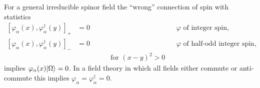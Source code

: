 \begin{theorem}
\label{thm:ch4-10-general-spin-statistics}

For a general irreducible spinor field the “wrong” connection of spin with
statistics
\begin{equation}
\begin{aligned}
  [\varphi_\alpha(x),\varphi_\alpha^\dagger(y)]_+&=0
    &&\varphi\text{ of integer spin},\\
  [\varphi_\alpha(x),\varphi_\alpha^\dagger(y)]_-&=0
    &&\varphi\text{ of half-odd integer spin},\\[-2pt]
  &\hspace{2cm}\text{for }(x-y)^2>0
\end{aligned}
  \tag{4-48}\label{eq:ch4-48-general-spin-wrong-statistics}
\end{equation}
implies $\varphi_\alpha(x)\lvert \Omega\rangle=0$.  In a field theory in which all
fields either commute or anti-commute this implies
$\varphi_\alpha=\varphi_\alpha^\dagger=0$.
\end{theorem}

